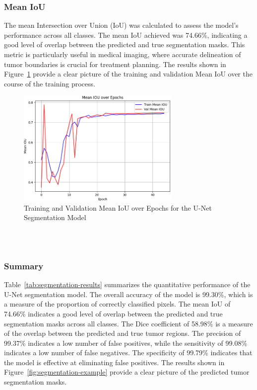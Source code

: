\subsubsection{Mean IoU}
The mean Intersection over Union (IoU) was calculated to assess the model's performance across all classes. The mean IoU achieved was 74.66\%, indicating a good level of overlap between the predicted and true segmentation masks. This metric is particularly useful in medical imaging, where accurate delineation of tumor boundaries is crucial for treatment planning. The results shown in Figure~\ref{fig:unet-iou} provide a clear picture of the training and validation Mean IoU over the course of the training process.
\begin{figure}[h]
  \centering
  \includegraphics[width=0.7\textwidth]{Images/Chapter3/unet_iou.png}
  \caption{Training and Validation Mean IoU over Epochs for the U-Net Segmentation Model}
  \label{fig:unet-iou}
\end{figure}
\\
\\
\subsubsection{Summary}
Table~\ref{tab:segmentation-results} summarizes the quantitative performance of the U-Net segmentation model. The overall accuracy of the model is 99.30\%, which is a measure of the proportion of correctly classified pixels. The mean IoU of 74.66\% indicates a good level of overlap between the predicted and true segmentation masks across all classes. The Dice coefficient of 58.98\% is a measure of the overlap between the predicted and true tumor regions. The precision of 99.37\% indicates a low number of false positives, while the sensitivity of 99.08\% indicates a low number of false negatives. The specificity of 99.79\% indicates that the model is effective at eliminating false positives. The results shown in Figure~\ref{fig:segmentation-example} provide a clear picture of the predicted tumor segmentation masks.

